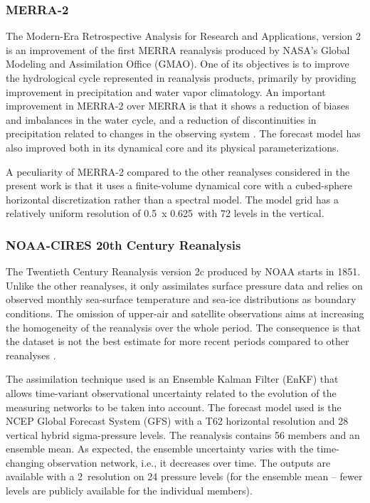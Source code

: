 \documentclass[smallextended]{svjour3}       %
\begin{document}
	
	\subsubsection{MERRA-2}
	
	The Modern-Era Retrospective Analysis for Research and Applications, version 2 \citep[MERRA-2 -- ][]{Gelaro2017} is an improvement of the first MERRA reanalysis \citep{Rienecker2011} produced by NASA's Global Modeling and Assimilation Office (GMAO). One of its objectives is to improve the hydrological cycle represented in reanalysis products, primarily by providing improvement in precipitation and water vapor climatology. An important improvement in MERRA-2 over MERRA is that it shows a reduction of biases and imbalances in the water cycle, and a reduction of discontinuities in precipitation related to changes in the observing system \citep{Gelaro2017}. The forecast model has also improved both in its dynamical core and its physical parameterizations.
	
	A peculiarity of MERRA-2 compared to the other reanalyses considered in the present work is that it uses a finite-volume dynamical core with a cubed-sphere horizontal discretization rather than a spectral model. The model grid has a relatively uniform resolution of 0.5\degree\ x 0.625\degree\ with 72 levels in the vertical.
	
	
	\subsubsection{NOAA-CIRES 20th Century Reanalysis}
	
	The Twentieth Century Reanalysis version 2c \citep[20CR-2c --][]{Compo2011} produced by NOAA starts in 1851. Unlike the other reanalyses, it only assimilates surface pressure data and relies on observed monthly sea-surface temperature and sea-ice distributions as boundary conditions. The omission of upper-air and satellite observations aims at increasing the homogeneity of the reanalysis over the whole period. The consequence is that the dataset is not the best estimate for more recent periods compared to other reanalyses \citep{Poli2017}.
	
	The assimilation technique used is an Ensemble Kalman Filter (EnKF) that allows time-variant observational uncertainty related to the evolution of the measuring networks to be taken into account. The forecast model used is the NCEP Global Forecast System (GFS) with a T62 horizontal resolution and 28 vertical hybrid sigma-pressure levels. The reanalysis contains 56 members and an ensemble mean. As expected, the ensemble uncertainty varies with the time-changing observation network, i.e., it decreases over time. The outputs are available with a 2\degree\ resolution on 24 pressure levels (for the ensemble mean -- fewer levels are publicly available for the individual members).
	
\end{document}

